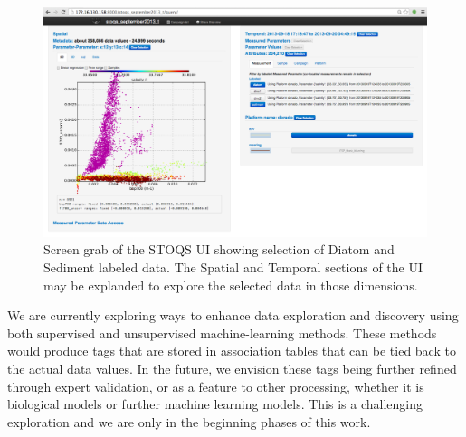 \begin{figure}[htbp]
\centering
\includegraphics[width=6.6in]{LabeledSelectionUI.png}
\caption{Screen grab of the STOQS UI showing selection of Diatom and Sediment labeled data. The Spatial and Temporal sections of the UI may be explanded to explore the selected data in those dimensions.}
\label{fig:LabeledSelectionUI}
\end{figure}


We are currently exploring ways to enhance data exploration and discovery using both supervised and unsupervised machine-learning methods.  These methods would produce tags that are stored in association tables that can be tied back to the actual data values.  In the future, we envision these tags being further refined through expert validation, or as a feature to other processing, whether it is biological models or further machine learning models.  This is a challenging exploration and we are only in the beginning phases of this work. 


